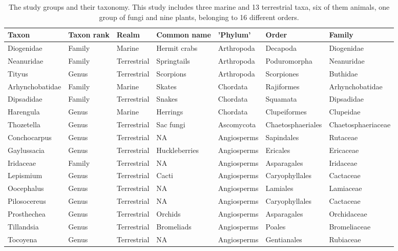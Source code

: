 \documentclass[
  12pt,
]{article}
\begin{document}
\begin{landscape}\begin{table}

\caption{\label{tab:tabletaxa}The study groups and their taxonomy. This study includes three marine and 13 terrestrial taxa, six of them animals, one group of fungi and nine plants, belonging to 16 different orders.}
\centering
\fontsize{11}{13}\selectfont
\begin{tabular}[t]{>{\raggedright\arraybackslash}p{2.5cm}>{\raggedright\arraybackslash}p{2cm}>{\raggedright\arraybackslash}p{2cm}>{\raggedright\arraybackslash}p{2.5cm}>{\raggedright\arraybackslash}p{2.5cm}ll}
\toprule
Taxon & Taxon rank & Realm & Common name & 'Phylum' & Order & Family\\
\midrule
Diogenidae & Family & Marine & Hermit crabs & Arthropoda & Decapoda & Diogenidae\\
Neanuridae & Family & Terrestrial & Springtails & Arthropoda & Poduromorpha & Neanuridae\\
Tityus & Genus & Terrestrial & Scorpions & Arthropoda & Scorpiones & Buthidae\\
Arhynchobatidae & Family & Marine & Skates & Chordata & Rajiformes & Arhynchobatidae\\
Dipsadidae & Family & Terrestrial & Snakes & Chordata & Squamata & Dipsadidae\\
\addlinespace
Harengula & Genus & Marine & Herrings & Chordata & Clupeiformes & Clupeidae\\
\hline
Thozetella & Genus & Terrestrial & Sac fungi & Ascomycota & Chaetosphaeriales & Chaetosphaeriaceae\\
\hline
Conchocarpus & Genus & Terrestrial & NA & Angiosperms & Sapindales & Rutaceae\\
Gaylussacia & Genus & Terrestrial & Huckleberries & Angiosperms & Ericales & Ericaceae\\
Iridaceae & Family & Terrestrial & NA & Angiosperms & Asparagales & Iridaceae\\
\addlinespace
Lepismium & Genus & Terrestrial & Cacti & Angiosperms & Caryophyllales & Cactaceae\\
Oocephalus & Genus & Terrestrial & NA & Angiosperms & Lamiales & Lamiaceae\\
Pilosocereus & Genus & Terrestrial & NA & Angiosperms & Caryophyllales & Cactaceae\\
Prosthechea & Genus & Terrestrial & Orchids & Angiosperms & Asparagales & Orchidaceae\\
Tillandsia & Genus & Terrestrial & Bromeliads & Angiosperms & Poales & Bromeliaceae\\
\addlinespace
Tocoyena & Genus & Terrestrial & NA & Angiosperms & Gentianales & Rubiaceae\\
\bottomrule
\end{tabular}
\end{table}
\end{landscape}
\end{document}
